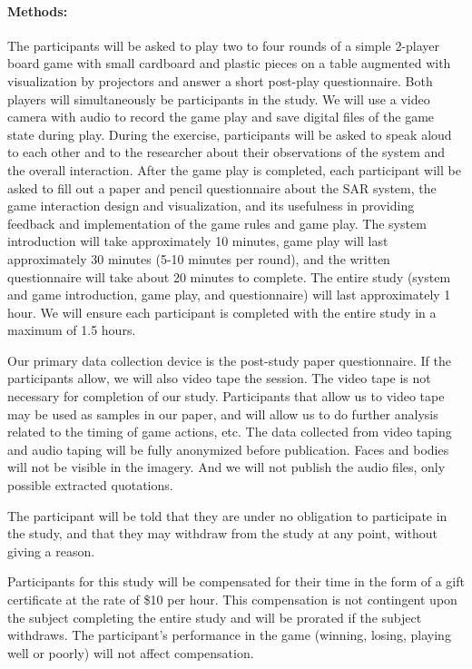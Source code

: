 \documentclass[10pt]{article}
\begin{document}
\paragraph{Methods:}
%
The participants will be asked to play two to four rounds of a simple
2-player board game with small cardboard and plastic pieces on a table
augmented with visualization by projectors and answer a short
post-play questionnaire.  Both players will simultaneously be
participants in the study.  We will use a video camera with audio to
record the game play and save digital files of the game state during
play.  During the exercise, participants will be asked to speak aloud
to each other and to the researcher about their observations of the
system and the overall interaction.  After the game play is completed,
each participant will be asked to fill out a paper and pencil
questionnaire about the SAR system, the game interaction design and
visualization, and its usefulness in providing feedback and
implementation of the game rules and game play.  The system
introduction will take approximately 10 minutes, game play will last
approximately 30 minutes (5-10 minutes per round), and the written
questionnaire will take about 20 minutes to complete.  The entire
study (system and game introduction, game play, and questionnaire)
will last approximately 1 hour.  We will ensure each participant is
completed with the entire study in a maximum of 1.5 hours.

Our primary data collection device is the post-study paper
questionnaire.  If the participants allow, we will also video tape the
session.  The video tape is not necessary for completion of our study.
Participants that allow us to video tape may be used as samples in our
paper, and will allow us to do further analysis related to the timing
of game actions, etc.  The data collected from video taping and audio
taping will be fully anonymized before publication.  Faces and bodies
will not be visible in the imagery.  And we will not publish the audio
files, only possible extracted quotations.

The participant will be told that they are under no obligation to
participate in the study, and that they may withdraw from the study at
any point, without giving a reason.  

Participants for this study will be compensated for their time in the
form of a gift certificate at the rate of \$10 per hour.  This
compensation is not contingent upon the subject completing the entire
study and will be prorated if the subject withdraws.  The
participant's performance in the game (winning, losing, playing well
or poorly) will not affect compensation.
\end{document}
